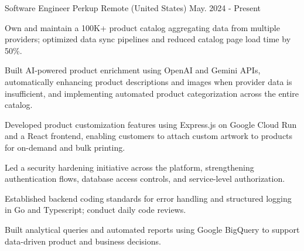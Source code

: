 

\begin{cventries}

\cventry
{Software Engineer} %
{Perkup} %
{Remote (United States)} %
{May. 2024 - Present} %
{
  \begin{cvitems} %
    \item{Own and maintain a 100K+ product catalog aggregating data from multiple providers; optimized data sync pipelines and reduced catalog page load time by 50\%.}
    \item{Built AI-powered product enrichment using OpenAI and Gemini APIs, automatically enhancing product descriptions and images when provider data is insufficient, and implementing automated product categorization across the entire catalog.}
    \item{Developed product customization features using Express.js on Google Cloud Run and a React frontend, enabling customers to attach custom artwork to products for on-demand and bulk printing.}
    \item{Led a security hardening initiative across the platform, strengthening authentication flows, database access controls, and service-level authorization.}
    \item{Established backend coding standards for error handling and structured logging in Go and Typescript; conduct daily code reviews.}
    \item{Built analytical queries and automated reports using Google BigQuery to support data-driven product and business decisions.}
  \end{cvitems}
}



\end{cventries}
